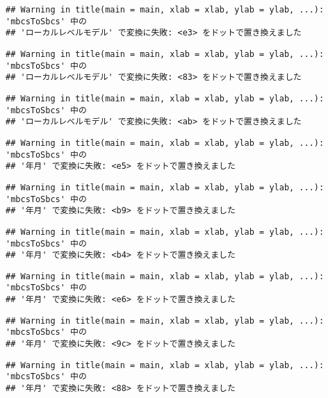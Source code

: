 \documentclass[]{article}
\begin{document}
\begin{verbatim}
## Warning in title(main = main, xlab = xlab, ylab = ylab, ...): 'mbcsToSbcs' 中の
## 'ローカルレベルモデル' で変換に失敗: <e3> をドットで置き換えました
\end{verbatim}

\begin{verbatim}
## Warning in title(main = main, xlab = xlab, ylab = ylab, ...): 'mbcsToSbcs' 中の
## 'ローカルレベルモデル' で変換に失敗: <83> をドットで置き換えました
\end{verbatim}

\begin{verbatim}
## Warning in title(main = main, xlab = xlab, ylab = ylab, ...): 'mbcsToSbcs' 中の
## 'ローカルレベルモデル' で変換に失敗: <ab> をドットで置き換えました
\end{verbatim}

\begin{verbatim}
## Warning in title(main = main, xlab = xlab, ylab = ylab, ...): 'mbcsToSbcs' 中の
## '年月' で変換に失敗: <e5> をドットで置き換えました
\end{verbatim}

\begin{verbatim}
## Warning in title(main = main, xlab = xlab, ylab = ylab, ...): 'mbcsToSbcs' 中の
## '年月' で変換に失敗: <b9> をドットで置き換えました
\end{verbatim}

\begin{verbatim}
## Warning in title(main = main, xlab = xlab, ylab = ylab, ...): 'mbcsToSbcs' 中の
## '年月' で変換に失敗: <b4> をドットで置き換えました
\end{verbatim}

\begin{verbatim}
## Warning in title(main = main, xlab = xlab, ylab = ylab, ...): 'mbcsToSbcs' 中の
## '年月' で変換に失敗: <e6> をドットで置き換えました
\end{verbatim}

\begin{verbatim}
## Warning in title(main = main, xlab = xlab, ylab = ylab, ...): 'mbcsToSbcs' 中の
## '年月' で変換に失敗: <9c> をドットで置き換えました
\end{verbatim}

\begin{verbatim}
## Warning in title(main = main, xlab = xlab, ylab = ylab, ...): 'mbcsToSbcs' 中の
## '年月' で変換に失敗: <88> をドットで置き換えました
\end{verbatim}
\end{document}
